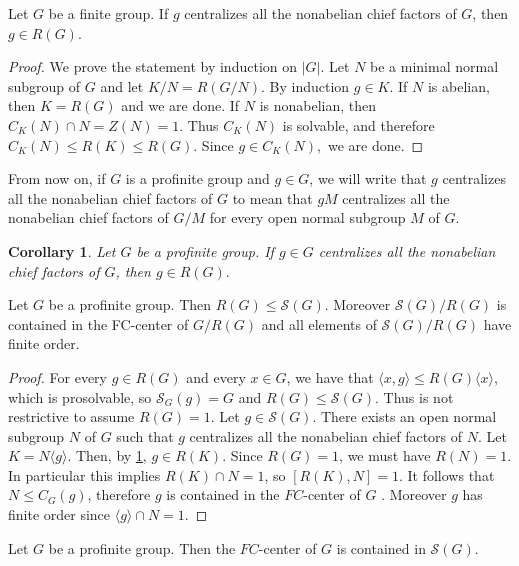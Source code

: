 \documentclass{amsart}
\newcommand{\la}{\langle}
\newcommand{\ra}{\rangle}
\newtheorem{cor}[thm]{Corollary}
\numberwithin{equation}{section}
\begin{document}
\begin{lemma}
Let $G$ be a finite group. If $g$ centralizes all the nonabelian chief factors of $G$, then $g\in R(G).$
\end{lemma}
\begin{proof}
	We prove the statement by induction on $|G|.$ Let $N$ be a minimal normal subgroup of $G$ and let $K/N=R(G/N)$. By induction $g\in K.$ If $N$ is abelian, then $K=R(G)$ and we are done. If $N$ is nonabelian, then $C_K(N)\cap N=Z(N)=1.$ Thus $C_K(N)$ is solvable, and therefore $C_K(N)\leq R(K)\leq R(G).$ Since $g\in C_K(N),$ we are done.
\end{proof}

From now on, if $G$ is a profinite group and $g \in G$, we will write that $g$ centralizes all the nonabelian chief factors of $G$ to mean that $gM$ centralizes all the nonabelian chief factors of $G/M$ for every open normal subgroup $M$ of $G.$

\begin{cor}\label{corradical}
Let $G$ be a profinite group. If $g \in G$ centralizes all the nonabelian chief factors of $G$, then $g\in R(G).$
\end{cor}



\begin{lemma}\label{fccenter}Let $G$ be a profinite group. Then $R(G) \leq \mathcal S(G)$. Moreover $\mathcal S(G)/R(G)$ is contained in the FC-center of $G/R(G)$ and all elements of $\mathcal S(G)/R(G)$ have finite order.
\end{lemma}
\begin{proof}
For every $g \in R(G)$ and every $x \in G$, we have that $\la x,g\ra \leq R(G)\langle x \rangle$, which is prosolvable, so $\mathcal S_G(g) = G$ and $R(G) \leq \mathcal S(G)$. Thus is not restrictive to assume $R(G)=1$. Let $g\in \mathcal S(G).$ There exists an open normal subgroup $N$ of $G$ such that $g$ centralizes all the nonabelian chief factors of $N.$ Let $K=N\langle g\rangle$. Then, by \cref{corradical}, $g\in R(K).$ Since $R(G)=1$, we must have $R(N)=1$. In particular this implies $R(K)\cap N=1$, so $[R(K),N] = 1$. It follows that $N\leq C_G(g)$, therefore $g$ is contained in the $FC$-center of $G$ . Moreover $g$ has finite order since $\langle g\rangle \cap N = 1$.
\end{proof}

\begin{lemma}\label{inclus}Let $G$ be a profinite group. Then the $FC$-center of $G$ is contained in $\mathcal S(G).$
\end{lemma}
\end{document}
